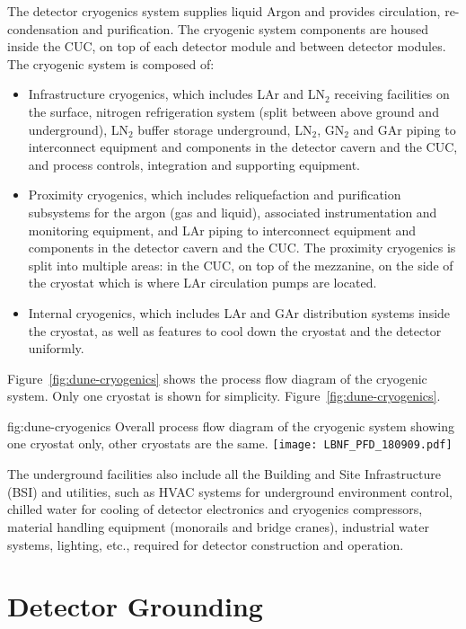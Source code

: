 The detector cryogenics system supplies liquid Argon and provides
circulation, re-condensation and purification. The cryogenic system
components are housed inside the CUC, on top of each detector module
and between detector modules. The cryogenic system is composed of:
\begin{itemize}
\item Infrastructure cryogenics, which includes LAr and LN$_2$ receiving
  facilities on the surface, nitrogen refrigeration system (split
  between above ground and underground), LN$_2$ buffer storage
  underground, LN$_2$, GN$_2$ and GAr piping to interconnect equipment and
  components in the detector cavern and the CUC, and process controls,
  integration and supporting equipment.
\item Proximity cryogenics, which includes reliquefaction and
  purification subsystems for the argon (gas and liquid), associated
  instrumentation and monitoring equipment, and LAr piping to
  interconnect equipment and components in the detector cavern and the
  CUC. The proximity cryogenics is split into multiple areas: in the
  CUC, on top of the mezzanine, on the side of the cryostat which is
  where LAr circulation pumps are located.
\item Internal cryogenics, which includes LAr and GAr distribution
  systems inside the cryostat, as well as features to cool down the
  cryostat and the detector uniformly.
\end{itemize}
Figure~\ref{fig:dune-cryogenics} shows the process flow diagram of the
 cryogenic system. Only one cryostat is shown for simplicity.
Figure~\ref{fig:dune-cryogenics}.
\begin{dunefigure}{fig:dune-cryogenics}
  {Overall process flow diagram of the cryogenic system showing one
    cryostat only, other cryostats are the same.}
  \texttt{[image: LBNF\_PFD\_180909.pdf]}
\end{dunefigure}


The underground facilities also include all the Building and Site
Infrastructure (BSI) and utilities, such as HVAC systems for
underground environment control, chilled water for cooling of detector
electronics and cryogenics compressors, material handling equipment
(monorails and bridge cranes), industrial water systems, lighting,
etc., required for detector construction and operation.


\section{Detector Grounding}
\label{sec:fdsp-coord-faci-grounding}


